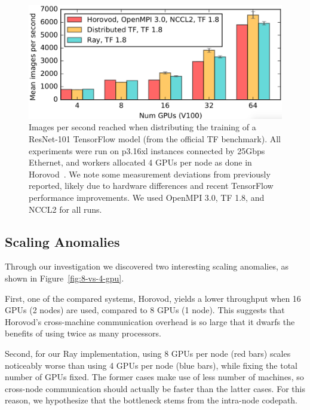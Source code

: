 \begin{figure}[tb]
    \centering
    \includegraphics[width=5.1in,keepaspectratio]{fig/sgd.png}
    \caption{
    \small{
        Images per second reached when distributing the training of a
        ResNet-101 TensorFlow model (from the official TF benchmark).
        All experiments were run on p3.16xl instances connected by 25Gbps Ethernet, and
        workers allocated 4 GPUs per node as done in Horovod~\cite{horovod}.
        We note some measurement deviations from previously reported, likely
        due to hardware differences and
        recent TensorFlow performance improvements. We used
        OpenMPI 3.0, TF 1.8, and NCCL2 for all runs.
    }
    }
    \label{fig:sgd}
\end{figure}

\subsection{Scaling Anomalies}
Through our investigation we discovered two interesting scaling anomalies, as
shown in Figure~\ref{fig:8-vs-4-gpu}.

First, one of the compared systems, Horovod, yields a lower throughput when 16
GPUs (2 nodes) are used, compared to 8 GPUs (1 node).  This suggests that
Horovod's cross-machine communication overhead is so large that it dwarfs the
benefits of using twice as many processors.

Second, for our Ray implementation, using 8 GPUs per node (red bars) scales
noticeably worse than using 4 GPUs per node (blue bars), while fixing the total
number of GPUs fixed.  The former cases make use of less number of machines, so
cross-node communication should actually be faster than the latter cases.  For
this reason, we hypothesize that the bottleneck stems from the intra-node
codepath.

